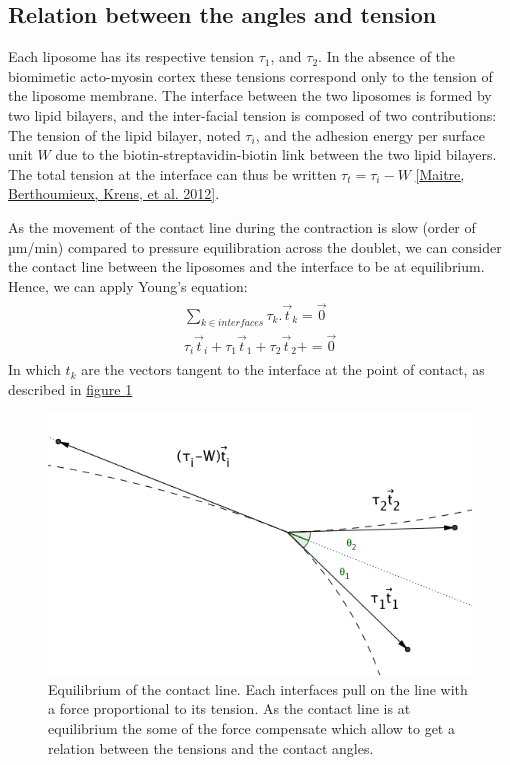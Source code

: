 \documentclass[A4paperpaper,11pt,english]{sphinxmanual}
\begin{document}
\subsection{Relation between the angles and tension}
\label{index-latex:relation-between-the-angles-and-tension}
Each liposome has its respective tension \(\tau_1\), and \(\tau_2\).  In the absence
of the biomimetic acto-myosin cortex these tensions correspond only to the
tension of the liposome membrane. The interface between the two liposomes is
formed by two lipid bilayers, and the inter-facial tension is composed of two contributions:
The tension of the lipid bilayer, noted \(\tau_i\), and the
adhesion energy per surface unit \(W\) due to the biotin-streptavidin-biotin link
between the two lipid bilayers. The total tension at the interface can thus be
written \(\tau_t = \tau_i -W\) {\hyperref[index-latex:maitre2012]{{[}Maitre, Berthoumieux, Krens,  et al.  2012{]}}}.

As the movement of the contact line during the contraction is slow (order of
µm/min) compared to pressure equilibration across the doublet, we can consider
the contact line between the liposomes and the interface to be at equilibrium.
Hence, we can apply Young's equation:
\label{index-latex:equation-eqa401}\begin{gather}
\begin{split}\sum_{k \in interfaces} \tau_k. \vec t_k  = \vec 0 \\
\tau_i \vec t_i + \tau_1 \vec t_1 + \tau_2 \vec t_2 + = \vec 0\end{split}\label{index-latex-eqa401}
\end{gather}
In which \(t_k\) are the vectors tangent to the interface at the point of
contact, as described in \hyperref[index-latex:fig-yd]{figure  \ref*{index-latex:fig-yd}}
\begin{figure}[htbp]
\centering
\capstart

\includegraphics[width=0.600\linewidth]{yd.png}
\caption{Equilibrium of the contact line. Each interfaces pull on the line with a
force proportional to its tension. As the contact line is at equilibrium
the some of the force compensate which allow to get a relation between the
tensions and the contact angles.}\label{index-latex:fig-yd}\end{figure}
\end{document}
